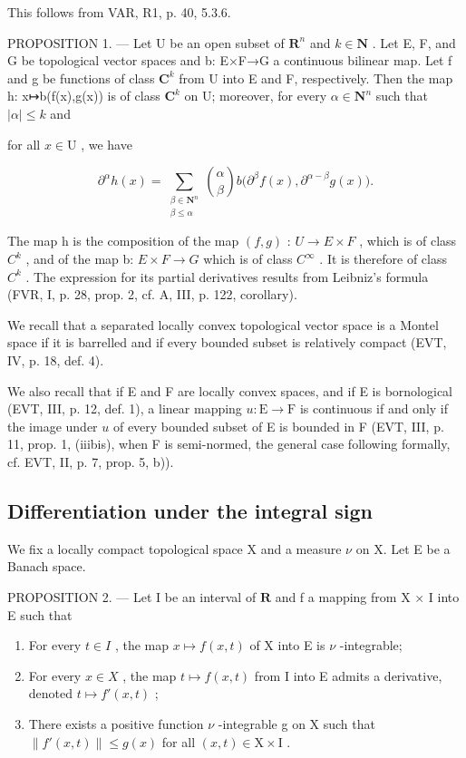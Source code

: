 This follows from VAR, R1, p. 40, 5.3.6.

PROPOSITION 1. --- Let U be an open subset of \(\mathbf{R}^{n}\) and \(k\in\mathbf{N}\) . Let E, F, and G be topological vector spaces and b: E×F→G a continuous bilinear map. Let f and g be functions of class \(\mathbf{C}^{k}\) from U into E and F, respectively. Then the map h: x↦b(f(x),g(x)) is of class \(\mathbf{C}^{k}\) on U; moreover, for every \(\alpha\in\mathbf{N}^{n}\) such that \(|\alpha|\leqslant k\) and

for all \(x \in \mathrm{U}\) , we have

\[
\partial^{\alpha}h(x) = \sum_{\substack{\beta \in \mathbf{N}^{n}\\ \beta \leqslant \alpha}}\binom {\alpha}{\beta}b\big(\partial^{\beta}f(x),\partial^{\alpha -\beta}g(x)\big).
\]

The map h is the composition of the map \((f,g)\) : \(U \rightarrow E \times F\) , which is of class \(C^{k}\) , and of the map b: \(E \times F \rightarrow G\) which is of class \(C^{\infty}\) . It is therefore of class \(C^{k}\) . The expression for its partial derivatives results from Leibniz's formula (FVR, I, p. 28, prop. 2, cf. A, III, p. 122, corollary).

We recall that a separated locally convex topological vector space is a Montel space if it is barrelled and if every bounded subset is relatively compact (EVT, IV, p. 18, def. 4).

We also recall that if E and F are locally convex spaces, and if E is bornological (EVT, III, p. 12, def. 1), a linear mapping \(u\colon\mathrm{E}\to\mathrm{F}\) is continuous if and only if the image under \(u\) of every bounded subset of E is bounded in F (EVT, III, p. 11, prop. 1, (iiibis), when F is semi-normed, the general case following formally, cf. EVT, II, p. 7, prop. 5, b)).

\subsection{Differentiation under the integral sign}

We fix a locally compact topological space X and a measure \(\nu\) on X. Let E be a Banach space.

PROPOSITION 2. --- Let I be an interval of \(\mathbf{R}\) and f a mapping from X × I into E such that

\begin{enumerate}
\def\labelenumi{(\roman{enumi})}
\item
  For every \(t \in I\) , the map \(x \mapsto f(x, t)\) of X into E is \(\nu\) -integrable;
\item
  For every \(x \in X\) , the map \(t \mapsto f(x, t)\) from I into E admits a derivative, denoted \(t \mapsto f'(x, t)\) ;
\item
  There exists a positive function \(\nu\) -integrable g on X such that \(\|f'(x,t)\| \leqslant g(x)\) for all \((x,t) \in \mathrm{X} \times \mathrm{I}\) .
\end{enumerate}

